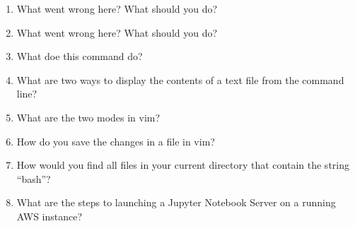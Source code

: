 \documentclass[letterpaper,10pt,english]{sphinxmanual}
\begin{document}
\begin{enumerate}
\item {} 
What went wrong here? What should you do?

%
\begin{sphinxVerbatim}[commandchars=\\\{\}]
         
       
\end{sphinxVerbatim}

\item {} 
What went wrong here? What should you do?

%
\begin{sphinxVerbatim}[commandchars=\\\{\}]
        
    
      
 
\end{sphinxVerbatim}

\item {} 
What doe this command do?

%
\begin{sphinxVerbatim}[commandchars=\\\{\}]
    
\end{sphinxVerbatim}

\item {} 
What are two ways to display the contents of a text file from the
command line?

\item {} 
What are the two modes in vim?

\item {} 
How do you save the changes in a file in vim?

\item {} 
How would you find all files in your current directory that contain
the string “bash”?

\item {} 
What are the steps to launching a Jupyter Notebook Server on a
running AWS instance?

\end{enumerate}
\end{document}
